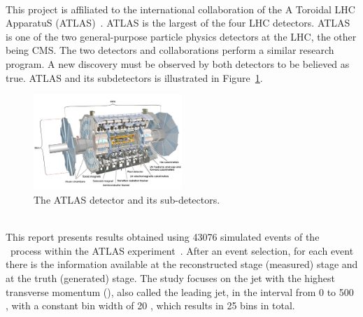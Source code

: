 \ \\This project is affiliated to the international collaboration of the A Toroidal LHC ApparatuS (ATLAS)~\cite{ATLAS}. ATLAS is the largest of the four LHC detectors. ATLAS is one of the two general-purpose particle physics detectors at the LHC, the other being CMS. The two detectors and collaborations perform a similar research program. A new discovery must be observed by both detectors to be believed as true. ATLAS and its subdetectors is illustrated in Figure~\ref{fig:ATLAS}.

\begin{figure}[h]
  \centering
  \includegraphics[width=0.5\textwidth]{plots/ATLAS.jpg} 
  \caption{The ATLAS detector and its sub-detectors.}
  \label{fig:ATLAS}
\end{figure}

\ \\ This report presents results obtained using 43076 simulated events of the \ttbaremu~process within the ATLAS experiment~\cite{RootFile}. After an event selection, for each event there is the information available at the reconstructed stage (measured) stage and at the truth (generated) stage. The study focuses on the jet with the highest transverse momentum (\pt), also called the leading jet, in the interval from 0 to 500 \GeV, with a constant bin width of 20 \GeV, which results in 25 bins in total.
